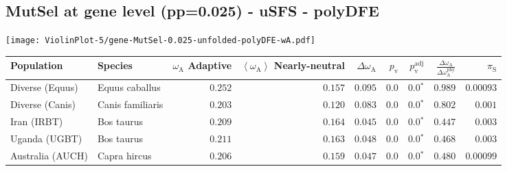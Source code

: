 \subsection{MutSel at gene level (pp=0.025) - uSFS - polyDFE} 
\begin{center}
\texttt{[image: ViolinPlot-5/gene-MutSel-0.025-unfolded-polyDFE-wA.pdf]} 
\begin{adjustbox}{width = 1\textwidth}
\begin{tabular}{|l|l|r|r|r|r|r|r|r|}
\toprule
                     Population &              Species & \specialcell{$\omega_{\mathrm{A}}$ \\ Adaptive} & \specialcell{$\left< \omega_{\mathrm{A}} \right>$ \\ Nearly-neutral} & $\Delta \omega_{\mathrm{A}} $ & $p_{\mathrm{v}}$ & $p_{\mathrm{v}}^{\mathrm{adj}}$ & $\frac{\Delta\omega_{\mathrm{A}}}{\Delta\omega_{\mathrm{A}}^{\mathrm{phy}}}$ & $\pi_{\textrm{S}}$ \\
\midrule
                Diverse (Equus) &       Equus caballus &                                        $ 0.252$ &                                           $ 0.157$ &                      $ 0.095$ &            $0.0$ &                  $\bm{0.0{^*}}$ &                                           $ 0.989$ &          $0.00093$ \\
                Diverse (Canis) &     Canis familiaris &                                        $ 0.203$ &                                           $ 0.120$ &                      $ 0.083$ &            $0.0$ &                  $\bm{0.0{^*}}$ &                                           $ 0.802$ &           $ 0.001$ \\
                    Iran (IRBT) &           Bos taurus &                                        $ 0.209$ &                                           $ 0.164$ &                      $ 0.045$ &            $0.0$ &                  $\bm{0.0{^*}}$ &                                           $ 0.447$ &           $ 0.003$ \\
                  Uganda (UGBT) &           Bos taurus &                                        $ 0.211$ &                                           $ 0.163$ &                      $ 0.048$ &            $0.0$ &                  $\bm{0.0{^*}}$ &                                           $ 0.468$ &           $ 0.003$ \\
               Australia (AUCH) &         Capra hircus &                                        $ 0.206$ &                                           $ 0.159$ &                      $ 0.047$ &            $0.0$ &                  $\bm{0.0{^*}}$ &                                           $ 0.480$ &          $0.00099$ \\

\end{tabular}
\end{adjustbox}
\end{center}
